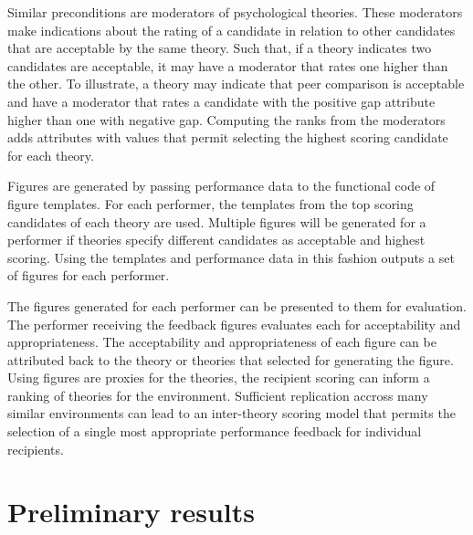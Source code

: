 \documentclass{amia}
\begin{document}
Similar preconditions are moderators of psychological theories.
These moderators make indications about the rating of a candidate in relation to other candidates that are acceptable by the same theory. 
Such that, if a theory indicates two candidates are acceptable, it may have a moderator that rates one higher than the other.
To illustrate, a theory may indicate that peer comparison is acceptable and have a moderator that rates a candidate with the positive gap attribute higher than one with negative gap.
Computing the ranks from the moderators adds attributes with values that permit selecting the highest scoring candidate for each theory.


Figures are generated by passing performance data to the functional code of figure templates.
For each performer, the templates from the top scoring candidates of each theory are used.
Multiple figures will be generated for a performer if theories specify different candidates as acceptable and highest scoring.
Using the templates and performance data in this fashion outputs a set of figures for each performer.

The figures generated for each performer can be presented to them for evaluation.
The performer receiving the feedback figures evaluates each for acceptability and appropriateness.
The acceptability and appropriateness of each figure can be attributed back to the theory or theories that selected for generating the figure.
Using figures are proxies for the theories, the recipient scoring can inform a ranking of theories for the environment.
Sufficient replication accross many similar environments can lead to an inter-theory scoring model that permits the selection of a single most appropriate performance feedback for individual recipients.

\section*{Preliminary results}
\end{document}
